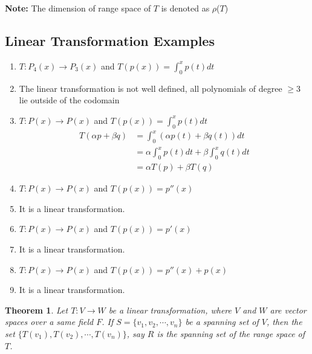 \documentclass[a4paper, titlepage]{article}
\newtheorem{theorem}{Theorem}[section]
\begin{document}
        \noindent\textbf{Note: }The dimension of range space of $T$
        is denoted as $\rho$($T$) 
        
    \subsection{Linear Transformation Examples}
        \begin{enumerate}[label=\textbf{\arabic*}]
            \item $T: P_4(x) \rightarrow P_3(x)$ and 
            $T\left(p(x)\right) = \displaystyle\int_0^x p(t) dt$
            \item[] The linear transformation is not well defined, all
            polynomials of degree $\ge 3$ lie outside of the codomain
            \item $T: P(x) \rightarrow P(x)$ and 
            $T\left(p(x)\right) = \displaystyle\int_0^x p(t) dt$
            \begin{align*}
                T(\alpha p + \beta q) &= \displaystyle\int_0^x \left(\alpha p(t) + \beta q(t)\right) dt \\
                                    &= \alpha\displaystyle\int_0^x p(t) dt + \beta\displaystyle\int_0^x q(t) dt \\
                                    &= \alpha T(p) + \beta T(q)
            \end{align*}
            \item $T: P(x) \rightarrow P(x)$ and 
            $T\left(p(x)\right) = p''(x)$
            \item[] It is a linear transformation.
            \item $T: P(x) \rightarrow P(x)$ and 
            $T\left(p(x)\right) = p'(x)$
            \item[] It is a linear transformation. 
            \item $T: P(x) \rightarrow P(x)$ and 
            $T\left(p(x)\right) = p''(x) + p(x)$
            \item[] It is a linear transformation. 
        \end{enumerate}
        \begin{theorem}
            Let $T: V \rightarrow W$ be a linear transformation, where
            $V$ and $W$ are vector spaces over a same field $F$. If $S =
            \{ v_1, v_2, \cdots, v_n \}$ be a spanning set of $V$, then the
            set $\{ T(v_1), T(v_2), \cdots, T(v_n) \}$, say $R$ is the
            spanning set of the range space of $T$.
        \end{theorem}
\end{document}
